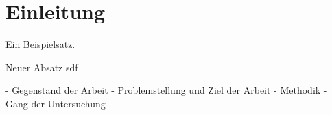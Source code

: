 \chapter{Einleitung}

Ein Beispielsatz. \parencite[Vgl.][S. 20]{Thompson:1984:RTT:358198.358210}

Neuer Absatz sdf


- Gegenstand der Arbeit
- Problemstellung und Ziel der Arbeit 
- Methodik
- Gang der Untersuchung

\Blindtext